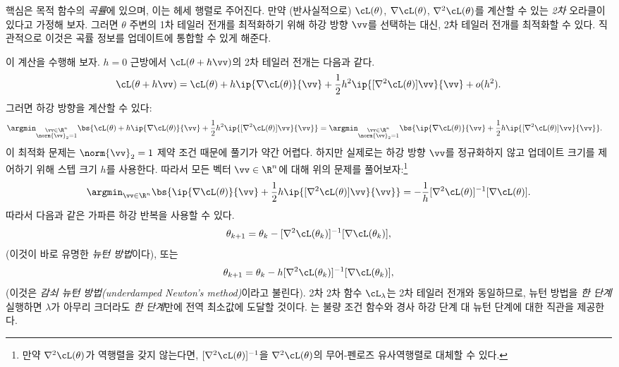 \documentclass[../../book-main_ko.tex]{subfiles}
\begin{document}
핵심은 목적 함수의 \textit{곡률}에 있으며, 이는 헤세 행렬로 주어진다. 만약 (반사실적으로) \(\cL(\theta)\), \(\nabla \cL(\theta)\), \(\nabla^{2}\cL(\theta)\)를 계산할 수 있는 \textit{2차} 오라클이 있다고 가정해 보자. 그러면 \(\theta\) 주변의 1차 테일러 전개를 최적화하기 위해 하강 방향 \(\vv\)를 선택하는 대신, 2차 테일러 전개를 최적화할 수 있다. 직관적으로 이것은 곡률 정보를 업데이트에 통합할 수 있게 해준다.

이 계산을 수행해 보자. \(h=0\) 근방에서 \(\cL(\theta + h\vv)\)의 2차 테일러 전개는 다음과 같다.
\begin{equation}
    \cL(\theta + h\vv) = \cL(\theta) + h\ip{\nabla \cL(\theta)}{\vv} + \frac{1}{2}h^{2}\ip{[\nabla^{2}\cL(\theta)]\vv}{\vv} + o(h^{2}).
\end{equation}
그러면 하강 방향을 계산할 수 있다:
\begin{align}
    \argmin_{\substack{\vv \in \R^{n} \\ \norm{\vv}_{2} = 1}}\bs{\cL(\theta) + h\ip{\nabla \cL(\theta)}{\vv} + \frac{1}{2}h^{2}\ip{[\nabla^{2}\cL(\theta)]\vv}{\vv}} 
    &= \argmin_{\substack{\vv \in \R^{n} \\ \norm{\vv}_{2} = 1}}\bs{\ip{\nabla \cL(\theta)}{\vv} + \frac{1}{2}h\ip{[\nabla^{2}\cL(\theta)]\vv}{\vv}}.
\end{align}
이 최적화 문제는 \(\norm{\vv}_{2} = 1\) 제약 조건 때문에 풀기가 약간 어렵다. 하지만 실제로는 하강 방향 \(\vv\)를 정규화하지 않고 업데이트 크기를 제어하기 위해 스텝 크기 \(h\)를 사용한다. 따라서 모든 벡터 \(\vv \in \R^{n}\)에 대해 위의 문제를 풀어보자:\footnote{만약 \(\nabla^{2}\cL(\theta)\)가 역행렬을 갖지 않는다면, \([\nabla^{2}\cL(\theta)]^{-1}\)을 \(\nabla^{2}\cL(\theta)\)의 무어-펜로즈 유사역행렬로 대체할 수 있다.}
\begin{equation}
    \argmin_{\vv \in \R^{n}}\bs{\ip{\nabla \cL(\theta)}{\vv} + \frac{1}{2}h\ip{[\nabla^{2}\cL(\theta)]\vv}{\vv}} = -\frac{1}{h}[\nabla^{2}\cL(\theta)]^{-1}[\nabla \cL(\theta)].
\end{equation}
따라서 다음과 같은 가파른 하강 반복을 사용할 수 있다.
\begin{equation}
    \theta_{k + 1} = \theta_{k} - [\nabla^{2}\cL(\theta_{k})]^{-1}[\nabla \cL(\theta_{k})],
\end{equation}
(이것이 바로 유명한 \textit{뉴턴 방법}이다), 또는
\begin{equation}
    \theta_{k + 1} = \theta_{k} - h[\nabla^{2}\cL(\theta_{k})]^{-1}[\nabla \cL(\theta_{k})],
\end{equation}
(이것은 \textit{감쇠 뉴턴 방법(underdamped Newton's method)}이라고 불린다). 2차 2차 함수 \(\cL_{\lambda}\)는 2차 테일러 전개와 동일하므로, 뉴턴 방법을 \textit{한 단계} 실행하면 \(\lambda\)가 아무리 크더라도 \textit{한 단계}만에 전역 최소값에 도달할 것이다. 는 불량 조건 함수와 경사 하강 단계 대 뉴턴 단계에 대한 직관을 제공한다.
\end{document}
